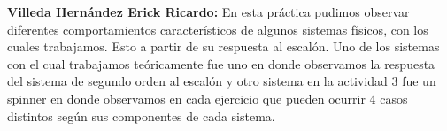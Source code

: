 \textbf{Villeda Hernández Erick Ricardo:} En esta práctica pudimos observar diferentes comportamientos característicos de algunos sistemas físicos, con los cuales trabajamos. Esto a partir de su respuesta al escalón. Uno de los sistemas con el cual trabajamos teóricamente fue uno en donde observamos la respuesta del sistema de segundo orden al escalón y otro sistema en la actividad 3 fue un spinner en donde observamos en cada ejercicio que pueden ocurrir 4 casos distintos según sus componentes de cada sistema.
